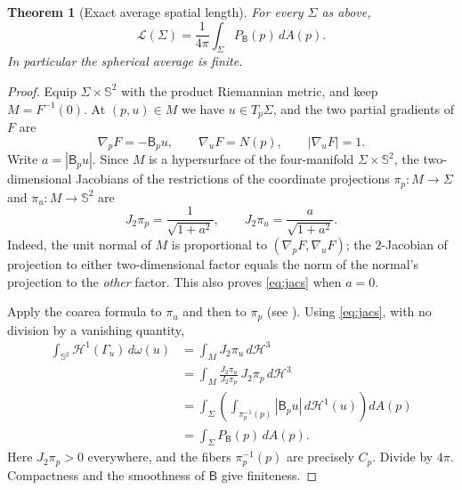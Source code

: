 \documentclass[10pt,a4paper]{article}
\newtheorem{theorem}{Theorem}[section]
\theoremstyle{remark}\newtheorem{remark}[theorem]{Remark}
\newcommand{\Sph}{\mathbb S^2}
\newcommand{\HH}{\mathcal H}
\newcommand{\Lc}{\mathcal L}
\newcommand{\Bop}{\mathsf B}
\begin{document}
\begin{theorem}[Exact average spatial length]\label{thm:spatial}
For every $\Sigma$ as above,
\begin{equation}\label{eq:spatial}
\boxed{\displaystyle \Lc(\Sigma)=\frac{1}{4\pi}\int_\Sigma P_\Bop(p)\,dA(p).}
\end{equation}
In particular the spherical average is finite.
\end{theorem}
\begin{proof}
Equip $\Sigma\times\Sph$ with the product Riemannian metric, and keep $M=F^{-1}(0)$. At $(p,u)\in M$ we have $u\in T_p\Sigma$, and the two partial gradients of $F$ are
\[
 \nabla_pF=-\Bop_pu,\qquad \nabla_uF=N(p),\qquad |\nabla_uF|=1.
\]
Write $a=|\Bop_pu|$. Since $M$ is a hypersurface of the four-manifold $\Sigma\times\Sph$, the two-dimensional Jacobians of the restrictions of the coordinate projections $\pi_p:M\to\Sigma$ and $\pi_u:M\to\Sph$ are
\begin{equation}\label{eq:jacs}
J_2\pi_p=\frac{1}{\sqrt{1+a^2}},\qquad
J_2\pi_u=\frac{a}{\sqrt{1+a^2}}.
\end{equation}
Indeed, the unit normal of $M$ is proportional to $(\nabla_pF,\nabla_uF)$; the $2$-Jacobian of projection to either two-dimensional factor equals the norm of the normal's projection to the \emph{other} factor. This also proves \eqref{eq:jacs} when $a=0$.

Apply the coarea formula to $\pi_u$ and then to $\pi_p$ (see \cite{Federer}). Using \eqref{eq:jacs}, with no division by a vanishing quantity,
\begin{align*}
\int_{\Sph}\HH^1(\Gamma_u)\,d\omega(u)
&=\int_M J_2\pi_u\,d\HH^3 \\
&=\int_M \frac{J_2\pi_u}{J_2\pi_p}\,J_2\pi_p\,d\HH^3 \\
&=\int_\Sigma\left(\int_{\pi_p^{-1}(p)}|\Bop_pu|\,d\HH^1(u)\right)dA(p)\\
&=\int_\Sigma P_\Bop(p)\,dA(p).
\end{align*}
Here $J_2\pi_p>0$ everywhere, and the fibers $\pi_p^{-1}(p)$ are precisely $C_p$. Divide by $4\pi$. Compactness and the smoothness of $\Bop$ give finiteness.
\end{proof}
\end{document}
